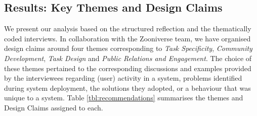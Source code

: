 \documentclass{sigchi}
\begin{document}
\begin{spacing}{0.97}
\section{Results: Key Themes and Design Claims}
We present our analysis based on the structured reflection and the thematically coded interviews. In collaboration with the Zooniverse team, we have organised design claims around four themes corresponding to \emph{Task Specificity}, \emph{Community Development}, \emph{Task Design} and \emph{Public Relations and Engagement}. The choice of these themes pertained to the corresponding discussions and examples provided by the interviewees regarding (user) activity in a system, problems identified during system deployment, the solutions they adopted, or a behaviour that was unique to a system. Table \ref{tbl:recommendations} summarises the themes and Design Claims assigned to each. %




\end{spacing}
\end{document}
